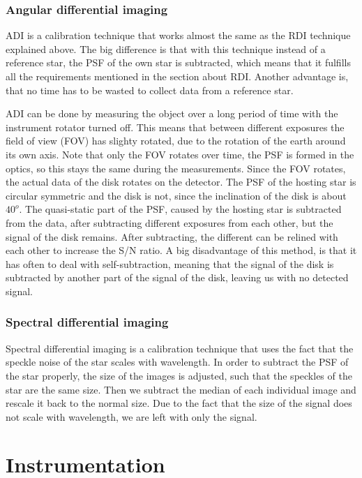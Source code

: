 \documentclass[twoside,single]{lion-msc}
\begin{document}
\subsection{Angular differential imaging}
ADI is a calibration technique that works almost the same as the RDI technique explained above. The big difference is that with this technique instead of a reference star, the PSF of the own star is subtracted, which means that it fulfills all the requirements mentioned in the section about RDI. Another advantage is, that no time has to be wasted to collect data from a reference star. 
\bigskip

ADI can be done by measuring the object over a long period of time with the instrument rotator turned off. This means that between different exposures the field of view (FOV) has slighty rotated, due to the rotation of the earth around its own axis. Note that only the FOV rotates over time, the PSF is formed in the optics, so this stays the same during the measurements. Since the FOV rotates, the actual data of the disk rotates on the detector. The PSF of the hosting star is circular symmetric and the disk is not, since the inclination of the disk is about $40^o$. The quasi-static part of the PSF, caused by the hosting star is subtracted from the data, after subtracting different exposures from each other, but the signal of the disk remains. After subtracting, the different can be relined with each other to increase the S/N ratio. A big disadvantage of this method, is that it has often to deal with self-subtraction, meaning that the signal of the disk is subtracted by another part of the signal of the disk, leaving us with no detected signal. \cite{Marois2005} 

\subsection{Spectral differential imaging}
Spectral differential imaging is a calibration technique that uses the fact that the speckle noise of the star scales with wavelength. In order to subtract the PSF of the star properly, the size of the images is adjusted, such that the speckles of the star are the same size. Then we subtract the median of each individual image and rescale it back to the normal size. Due to the fact that the size of the signal does not scale with wavelength, we are left with only the signal.

\chapter{Instrumentation}
\end{document}
